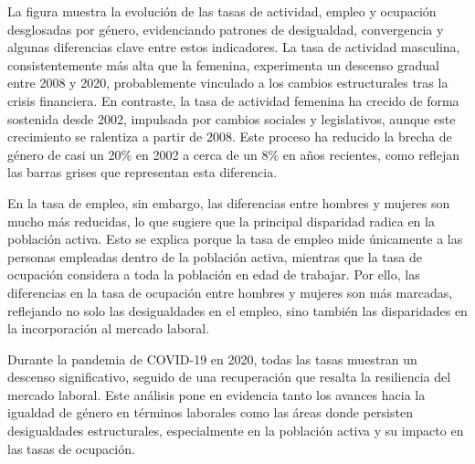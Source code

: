 \documentclass[notspecified,article,submit,moreauthors,pdftex]{Definitions/mdpi}
\begin{document}
La figura muestra la evolución de las tasas de actividad, empleo y
ocupación desglosadas por género, evidenciando patrones de desigualdad,
convergencia y algunas diferencias clave entre estos indicadores. La
tasa de actividad masculina, consistentemente más alta que la femenina,
experimenta un descenso gradual entre 2008 y 2020, probablemente
vinculado a los cambios estructurales tras la crisis financiera. En
contraste, la tasa de actividad femenina ha crecido de forma sostenida
desde 2002, impulsada por cambios sociales y legislativos, aunque este
crecimiento se ralentiza a partir de 2008. Este proceso ha reducido la
brecha de género de casi un 20\% en 2002 a cerca de un 8\% en años
recientes, como reflejan las barras grises que representan esta
diferencia.

En la tasa de empleo, sin embargo, las diferencias entre hombres y
mujeres son mucho más reducidas, lo que sugiere que la principal
disparidad radica en la población activa. Esto se explica porque la tasa
de empleo mide únicamente a las personas empleadas dentro de la
población activa, mientras que la tasa de ocupación considera a toda la
población en edad de trabajar. Por ello, las diferencias en la tasa de
ocupación entre hombres y mujeres son más marcadas, reflejando no solo
las desigualdades en el empleo, sino también las disparidades en la
incorporación al mercado laboral.

Durante la pandemia de COVID-19 en 2020, todas las tasas muestran un
descenso significativo, seguido de una recuperación que resalta la
resiliencia del mercado laboral. Este análisis pone en evidencia tanto
los avances hacia la igualdad de género en términos laborales como las
áreas donde persisten desigualdades estructurales, especialmente en la
población activa y su impacto en las tasas de ocupación.


\vspace{6pt}



\end{document}
